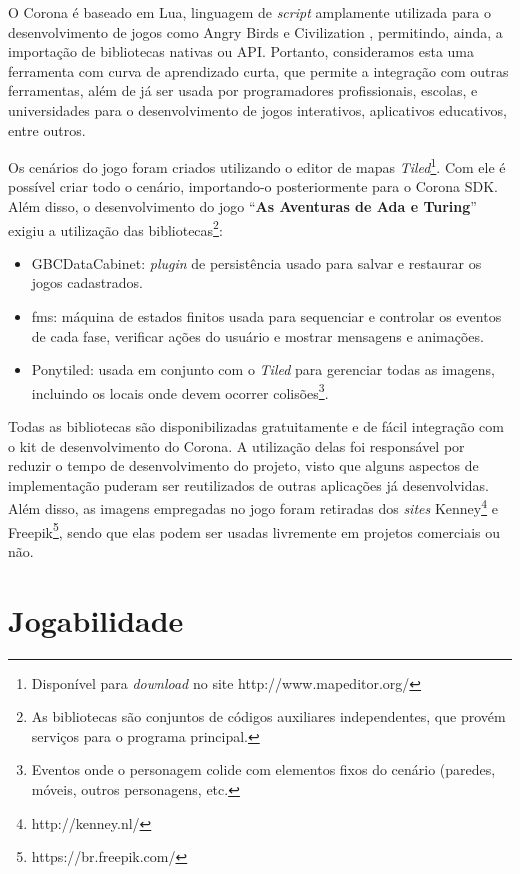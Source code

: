 O Corona é baseado em Lua, linguagem de \textit{script} amplamente utilizada para o desenvolvimento de jogos como Angry Birds \texttrademark e Civilization \texttrademark, permitindo, ainda, a importação de bibliotecas nativas ou \acrshort{API}. Portanto, consideramos esta uma ferramenta com curva de aprendizado curta, que permite a integração com outras ferramentas, além de já ser usada por programadores profissionais, escolas, e universidades para o desenvolvimento de jogos interativos, aplicativos educativos, entre outros.

Os cenários do jogo foram criados utilizando o editor de mapas \textit{Tiled}\footnote{Disponível para \textit{download} no site http://www.mapeditor.org/}. Com ele é possível criar todo o cenário, importando-o posteriormente para o Corona SDK. Além disso, o desenvolvimento do jogo “\textbf{As Aventuras de Ada e Turing}” exigiu a utilização das bibliotecas\footnote{As bibliotecas são conjuntos de códigos auxiliares independentes, que provém serviços para o programa principal.}:

\begin{itemize}
	\item GBCDataCabinet: \textit{plugin} de persistência usado para salvar e restaurar os jogos cadastrados.
	\item fms: máquina de estados finitos usada para sequenciar e controlar os eventos de cada fase, verificar ações do usuário e mostrar mensagens e animações.
	\item Ponytiled: usada em conjunto com o \textit{Tiled} para gerenciar todas as imagens, incluindo os locais onde devem ocorrer colisões\footnote{Eventos onde o personagem colide com elementos fixos do cenário (paredes, móveis, outros personagens, etc.}. 
\end{itemize}

Todas as bibliotecas são disponibilizadas gratuitamente e de fácil integração com o kit de desenvolvimento do Corona. A utilização delas foi responsável por reduzir o tempo de desenvolvimento do projeto, visto que alguns aspectos de implementação puderam ser reutilizados de outras aplicações já desenvolvidas. Além disso, as imagens empregadas no jogo foram retiradas dos \textit{sites} Kenney\footnote{http://kenney.nl/} e Freepik\footnote{https://br.freepik.com/}, sendo que elas podem ser usadas livremente em projetos comerciais ou não.

\section{Jogabilidade} \label{sec:jogabilidade}

